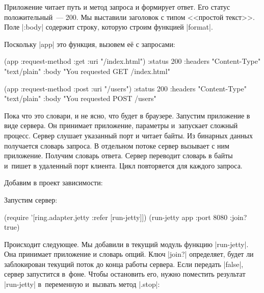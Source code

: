 Приложение читает путь и метод запроса и формирует ответ. Его статус
положительный~--- 200. Мы выставили заголовок с типом <<простой текст>>. Поле
\spverb|:body| содержит строку, которую строим функцией \spverb|format|.

Поскольку \spverb|app| это функция, вызовем е\"{е} с запросами:

\begin{english}
  \begin{clojure}
(app {:request-method :get :uri "/index.html"})
{:status 200
 :headers {"Content-Type" "text/plain"}
 :body "You requested GET /index.html"}

(app {:request-method :post :uri "/users"})
{:status 200
 :headers {"Content-Type" "text/plain"}
 :body "You requested POST /users"}
  \end{clojure}
\end{english}

Пока что это словари, и не ясно, что будет в браузере. Запустим приложение в
виде сервера. Он принимает приложение, параметры и~запускает сложный
процесс. Сервер слушает указанный порт и читает байты. Из бинарных данных
получается словарь запроса. В отдельном потоке сервер вызывает с ним
приложение. Получим словарь ответа. Сервер переводит словарь в байты и~пишет в
удаленный порт клиента. Цикл повторяется для каждого запроса.


Добавим в проект зависимости:

\begin{english}
  \begin{clojure}
  \end{clojure}
\end{english}

Запустим сервер:

\begin{english}
  \begin{clojure}
(require '[ring.adapter.jetty :refer [run-jetty]])
(run-jetty app {:port 8080 :join? true})
  \end{clojure}
\end{english}

Происходит следующее. Мы добавили в текущий модуль функцию
\spverb|run-jetty|. Она принимает приложение и словарь опций. Ключ
\spverb|join?| определяет, будет ли заблокирован текущий поток до конца работы
сервера. Если передать \spverb|false|, сервер запустится в~фоне. Чтобы
остановить его, нужно поместить результат \spverb|run-jetty| в~переменную
и~вызвать метод \spverb|.stop|:

